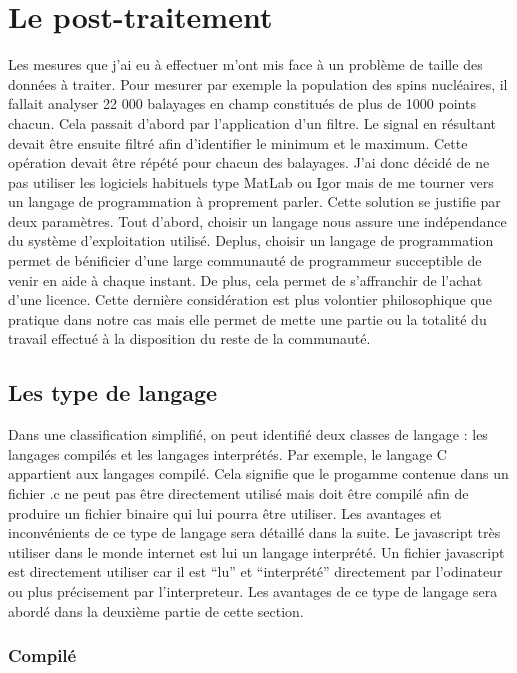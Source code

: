 \chapter{Le post-traitement}

Les mesures que j'ai eu à effectuer m'ont mis face à un problème de taille des données à traiter. Pour mesurer par exemple la population des spins nucléaires, il fallait analyser 22 000 balayages en champ constitués de plus de 1000 points chacun. Cela passait d'abord par l'application d'un filtre. Le signal en résultant devait être ensuite filtré afin d'identifier le minimum et le maximum. Cette opération devait être répété pour chacun des balayages. J'ai donc décidé de ne pas utiliser les logiciels habituels type MatLab ou Igor mais de me tourner vers un langage de programmation à proprement parler. Cette solution se justifie par deux paramètres. Tout d'abord, choisir un langage nous assure une indépendance du système d'exploitation utilisé. Deplus, choisir un langage de programmation permet de bénificier d'une large communauté de programmeur succeptible de venir en aide à chaque instant. De plus, cela permet de s'affranchir de l'achat d'une licence. Cette dernière considération est plus volontier philosophique que pratique dans notre cas mais elle permet de mette une partie ou la totalité du travail effectué à la disposition du reste de la communauté.

\section{Les type de langage}
Dans une classification simplifié, on peut identifié deux classes de langage : les langages compilés et les langages interprétés. Par exemple, le langage C appartient aux langages compilé. Cela signifie que le progamme contenue dans un fichier .c ne peut pas être directement utilisé mais doit être compilé afin de produire un fichier binaire qui lui pourra être utiliser. Les avantages et inconvénients de ce type de langage sera détaillé dans la suite. Le javascript très utiliser dans le monde internet est lui un langage interprété. Un fichier javascript est directement utiliser car il est ``lu'' et ``interprété'' directement par l'odinateur ou plus précisement par l'interpreteur. Les avantages de ce type de langage sera abordé dans la deuxième partie de cette section.

\subsection{Compilé}
